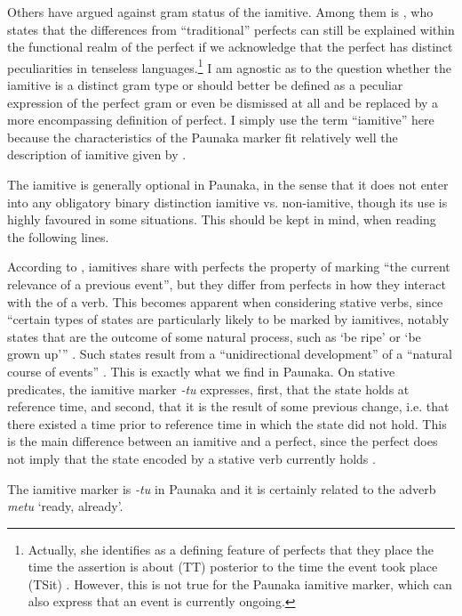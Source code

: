 Others have argued against gram status of the iamitive. Among them is \citet[]{Krajinovic2019}, who states that the differences from “traditional” perfects can still be explained within the functional realm of the perfect if we acknowledge that the perfect has distinct peculiarities in tenseless languages.\footnote{Actually, she identifies as a defining feature of perfects that they place the time the assertion is about (TT) posterior to the time the event took place (TSit) \citep[107]{Krajinovic2019}. However, this is not true for the Paunaka iamitive marker, which can also express that an event is currently ongoing.} I am agnostic as to the question whether the iamitive is a distinct gram type or should better be defined as a peculiar expression of the perfect gram or even be dismissed at all and be replaced by a more encompassing definition of perfect. I simply use the term “iamitive” here because the characteristics of the Paunaka marker fit relatively well the description of iamitive given by \citet[]{Olsson2013}. 

The iamitive is generally optional in Paunaka, in the sense that it does not enter into any obligatory binary distinction iamitive vs. non-iamitive, though its use is highly favoured in some situations. This should be kept in mind, when reading the following lines. 

According to \citet[4]{Olsson2013}, iamitives share with perfects the property of marking “the current relevance of a previous event”, but they differ from perfects in how they interact with the  of a verb. This becomes apparent when considering stative verbs, since “certain types of states are particularly likely to be marked by iamitives, notably states that are the outcome of some natural process, such as ‘be ripe’ or ‘be grown up’” \citep[4]{Olsson2013}. Such states result from a “unidirectional development” of a “natural course of events” \citep[30]{Olsson2013}. This is exactly what we find in Paunaka. On stative predicates, the iamitive marker \textit{-tu} expresses, first, that the state holds at reference time, and second, that it is the result of some previous change, i.e. that there existed a time prior to reference time in which the state did not hold. This is the main difference between an iamitive and a perfect, since the perfect does not imply that the state encoded by a stative verb currently holds \citep[cf.][9]{Olsson2013}.

The iamitive marker is \textit{-tu} in Paunaka and it is certainly related to the adverb \textit{metu} ‘ready, already’.

